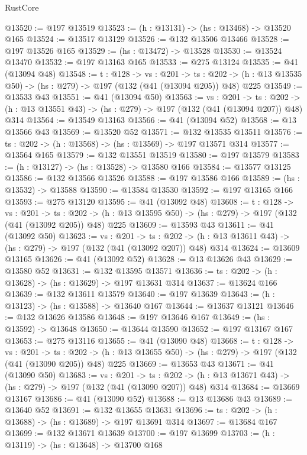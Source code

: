 \begin{lexlean}{RustCore}
\begin{coremodule}
@13520 := @197 @13519
@13523 := (h : @13131) -> (hs : @13468) -> @13520 @165
@13524 := @13517 @13129
@13526 := @132 @13506 @13466
@13528 := @197 @13526 @165
@13529 := (hs : @13472) -> @13528
@13530 := @13524 @13470
@13532 := @197 @13163 @165
@13533 := @275 @13124
@13535 := @41 (@13094 @48)
@13548 := {t : @128} ->
  {vs : @201} ->
  {ts : @202} -> (h : @13 @13535 @50) -> (hs : @279) -> @197 (@132 (@41 (@13094 @205)) @48) @225
@13549 := @13533 @43
@13551 := @41 (@13094 @50)
@13563 := {vs : @201} ->
  {ts : @202} -> (h : @13 @13551 @43) -> (hs : @279) -> @197 (@132 (@41 (@13094 @207)) @48) @314
@13564 := @13549 @13163
@13566 := @41 (@13094 @52)
@13568 := @13 @13566 @43
@13569 := @13520 @52
@13571 := @132 @13535 @13511
@13576 := {ts : @202} -> (h : @13568) -> (hs : @13569) -> @197 @13571 @314
@13577 := @13564 @165
@13579 := @132 @13551 @13519
@13580 := @197 @13579
@13583 := (h : @13127) -> (hs : @13528) -> @13580 @166
@13584 := @13577 @13125
@13586 := @132 @13566 @13526
@13588 := @197 @13586 @166
@13589 := (hs : @13532) -> @13588
@13590 := @13584 @13530
@13592 := @197 @13165 @166
@13593 := @275 @13120
@13595 := @41 (@13092 @48)
@13608 := {t : @128} ->
  {vs : @201} ->
  {ts : @202} -> (h : @13 @13595 @50) -> (hs : @279) -> @197 (@132 (@41 (@13092 @205)) @48) @225
@13609 := @13593 @43
@13611 := @41 (@13092 @50)
@13623 := {vs : @201} ->
  {ts : @202} -> (h : @13 @13611 @43) -> (hs : @279) -> @197 (@132 (@41 (@13092 @207)) @48) @314
@13624 := @13609 @13165
@13626 := @41 (@13092 @52)
@13628 := @13 @13626 @43
@13629 := @13580 @52
@13631 := @132 @13595 @13571
@13636 := {ts : @202} -> (h : @13628) -> (hs : @13629) -> @197 @13631 @314
@13637 := @13624 @166
@13639 := @132 @13611 @13579
@13640 := @197 @13639
@13643 := (h : @13123) -> (hs : @13588) -> @13640 @167
@13644 := @13637 @13121
@13646 := @132 @13626 @13586
@13648 := @197 @13646 @167
@13649 := (hs : @13592) -> @13648
@13650 := @13644 @13590
@13652 := @197 @13167 @167
@13653 := @275 @13116
@13655 := @41 (@13090 @48)
@13668 := {t : @128} ->
  {vs : @201} ->
  {ts : @202} -> (h : @13 @13655 @50) -> (hs : @279) -> @197 (@132 (@41 (@13090 @205)) @48) @225
@13669 := @13653 @43
@13671 := @41 (@13090 @50)
@13683 := {vs : @201} ->
  {ts : @202} -> (h : @13 @13671 @43) -> (hs : @279) -> @197 (@132 (@41 (@13090 @207)) @48) @314
@13684 := @13669 @13167
@13686 := @41 (@13090 @52)
@13688 := @13 @13686 @43
@13689 := @13640 @52
@13691 := @132 @13655 @13631
@13696 := {ts : @202} -> (h : @13688) -> (hs : @13689) -> @197 @13691 @314
@13697 := @13684 @167
@13699 := @132 @13671 @13639
@13700 := @197 @13699
@13703 := (h : @13119) -> (hs : @13648) -> @13700 @168

\end{coremodule}
\end{lexlean}
